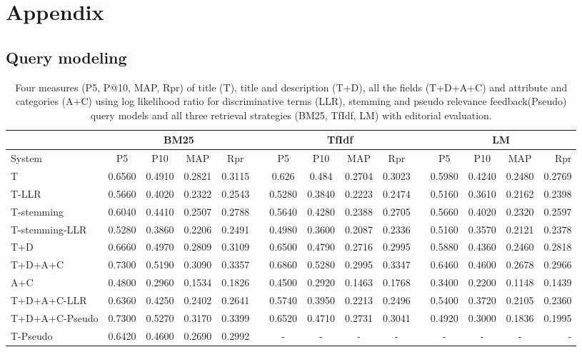 \chapter{Appendix}

\section{Query modeling}

\begin{table}[H]
\begin{center}
\scriptsize
\caption{
Four measures (P\@5, P@10, MAP, Rpr) of title (T), title and description (T+D), all the fields (T+D+A+C) and attribute and categories (A+C) using log likelihood ratio for discriminative terms (LLR), stemming and pseudo relevance feedback(Pseudo) query models and all three retrieval strategies (BM25, TfIdf, LM)  with editorial evaluation.}
\label{table:qmEd}

\begin{tabular}{lcccccccccccccr}
\toprule
 & \multicolumn{4}{c}{BM25} &    & \multicolumn{4}{c}{TfIdf} &    & \multicolumn{4}{c}{LM} \\
\midrule
System & P\@5 & P\@10 & MAP & Rpr &   & P\@5 & P\@10 & MAP & Rpr &   & P\@5 & P\@10 & MAP & Rpr \\
\midrule
	T & 0.6560 & 0.4910 & 0.2821 & 0.3115 &   & 0.626 & 0.484 & 0.2704 & 0.3023 &   & 0.5980 & 0.4240 & 0.2480 & 0.2769 \\

	T-LLR & 0.5660 & 0.4020 & 0.2322 & 0.2543 &   & 0.5280 & 0.3840 & 0.2223 & 0.2474 &   & 0.5160 & 0.3610 & 0.2162 & 0.2398 \\
	T-stemming & 0.6040 & 0.4410 & 0.2507 & 0.2788 &   & 0.5640 & 0.4280 & 0.2388 & 0.2705 &   & 0.5660 & 0.4020 & 0.2320 & 0.2597 \\
	T-stemming-LLR & 0.5280 & 0.3860 & 0.2206 & 0.2491 &   & 0.4980 & 0.3600 & 0.2087 & 0.2336 &   & 0.5160 & 0.3570 & 0.2121 & 0.2378 \\
	T+D & 0.6660 & 0.4970 & 0.2809 & 0.3109 &   & 0.6500 & 0.4790 & 0.2716 & 0.2995 &   & 0.5880 & 0.4360 & 0.2460 & 0.2818 \\
	T+D+A+C & 0.7300 & 0.5190 & 0.3090 & 0.3357 &   & 0.6860 & 0.5280 & 0.2995 & 0.3347 &   & 0.6460 & 0.4600 & 0.2678 & 0.2966 \\
	A+C & 0.4800 & 0.2960 & 0.1534 & 0.1826 &   & 0.4500 & 0.2920 & 0.1463 & 0.1768 &   & 0.3400 & 0.2200 & 0.1148 & 0.1439 \\
	T+D+A+C-LLR & 0.6360 & 0.4250 & 0.2402 & 0.2641 &    & 0.5740 & 0.3950 & 0.2213 & 0.2496 &    & 0.5400 & 0.3720 & 0.2105 & 0.2360 \\
	T+D+A+C-Pseudo & 0.7300 & 0.5270 & 0.3170 & 0.3399 &   & 0.6520 & 0.4710 & 0.2731 & 0.3041 &   & 0.4920 & 0.3000 & 0.1836 & 0.1995 \\
	T-Pseudo & 0.6420 & 0.4600 & 0.2690 & 0.2992 &   & - & - & - & - &   & - & - & - & -   \\
\bottomrule
\end{tabular}
\end{center}
\end{table}



